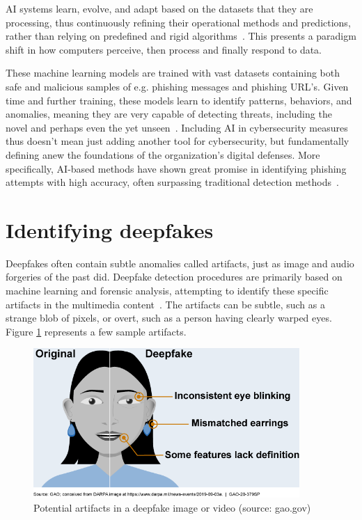 AI systems learn, evolve, and adapt based on the datasets that they are processing, thus continuously refining their operational methods and predictions, rather than relying on predefined and rigid algorithms~\citep{fakhouri_AI_Driven_Solutions_SE_Attacks_2024}. This presents a paradigm shift in how computers perceive, then process and finally respond to data.

These machine learning models are trained with vast datasets containing both safe and malicious samples of e.g. phishing messages and phishing URL's. Given time and further training, these models learn to identify patterns, behaviors, and anomalies, meaning they are very capable of detecting threats, including the novel and perhaps even the yet unseen~\citep{fakhouri_AI_Driven_Solutions_SE_Attacks_2024}. Including AI in cybersecurity measures thus doesn't mean just adding another tool for cybersecurity, but fundamentally defining anew the foundations of the organization’s digital defenses. More specifically, AI-based methods have shown great promise in identifying phishing attempts with high accuracy, often surpassing traditional detection methods~\citep{basit_Comprehensive_Survey_AI_Phishing_Detection_2021}.




\section{Identifying deepfakes}

Deepfakes often contain subtle anomalies called artifacts, just as image and audio forgeries of the past did. Deepfake detection procedures are primarily based on machine learning and forensic analysis, attempting to identify these specific artifacts in the multimedia content~\citep{mirsky_Creation_Detection_Deepfakes_2021}. The artifacts can be subtle, such as a strange blob of pixels, or overt, such as a person having clearly warped eyes. Figure \ref{figure:artifacts} represents a few sample artifacts.

\begin{figure}[h]  
    \centering  
    \includegraphics[width=0.9\textwidth]{images/rId14_image5.png}  
    \caption{Potential artifacts in a deepfake image or video (source: gao.gov)}  
    \label{figure:artifacts}  
\end{figure}  

